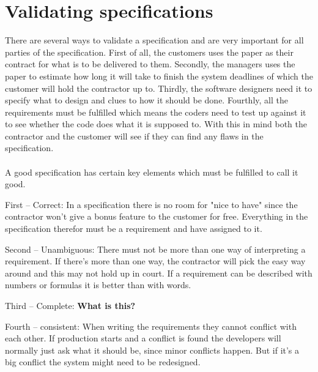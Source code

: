 \documentclass[Main]{subfiles}
\begin{document}
\section{Validating specifications}


There are several ways to validate a specification and are very important for all parties of the specification.
First of all, the customers uses the paper as their contract for what is to be delivered to them.
Secondly, the managers uses the paper to estimate how long it will take to finish the system deadlines of which the customer will hold the contractor up to.
Thirdly, the software designers need it to specify what to design and clues to how it should be done.
Fourthly, all the requirements must be fulfilled which means the coders need to test up against it to see whether the code does what it is supposed to.
With this in mind both the contractor and the customer will see if they can find any flaws in the specification.
\\
\\
A good specification has certain key elements which must be fulfilled to call it good.


First -- Correct:
In a specification there is no room for "nice to have" since the contractor won't give a bonus  feature to the customer for free.
Everything in the specification therefor must be a requirement and have assigned to it.

Second -- Unambiguous:
There must not be more than one way of interpreting a requirement. 
If there's more than one way, the contractor will pick the easy way around and this may not hold up in court.
If a requirement can be described with numbers or formulas it is better than with words.

Third -- Complete:
\textbf{What is this?}

Fourth -- consistent:
When writing the requirements they cannot conflict with each other.
If production starts and a conflict is found the developers will normally just ask what it should be, since minor conflicts happen.
But if it's a big conflict the system might need to be redesigned. 
\end{document}
